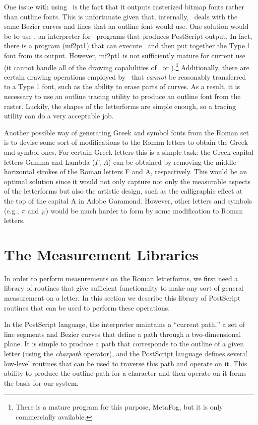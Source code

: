 \documentclass[12pt]{article}
\begin{document}
One issue with using \MF\ is the fact that it outputs rasterized bitmap fonts
rather than outline fonts. This is unfortunate given that, internally, \MF\
deals with the same Bezier curves and lines that an outline font would use. One
solution would be to use \MP, an interpreter for \MF\ programs that produces
PostScript output. In fact, there is a program (mf2pt1) that can execute \MP\
and then put together the Type 1 font from its output. However, mf2pt1 is not
sufficiently mature for current use (it cannot handle all of the drawing
capabilities of \MF\ or \MP).\footnote{There is a mature program for this
purpose, MetaFog, but it is only commercially available.} Additionally, there
are certain drawing operations employed by \MF\ that \emph{cannot} be reasonably
transferred to a Type 1 font, such as the ability to erase parts of curves. As a
result, it is necessary to use an outline tracing utility to produce an outline
font from the raster. Luckily, the shapes of the letterforms are simple enough,
so a tracing utility can do a very acceptable job.

Another possible way of generating Greek and symbol fonts from the Roman set is
to devise some sort of modifications to the Roman letters to obtain the Greek
and symbol ones. For certain Greek letters this is a simple task: the Greek
capital letters Gamma and Lambda ($\Gamma$, $\Lambda$) can be obtained by
removing the middle horizontal strokes of the Roman letters F and A,
respectively. This would be an optimal solution since it would not only capture
not only the measurable aspects of the letterforms but also the artistic design,
such as the calligraphic effect at the top of the capital A in Adobe Garamond.
However, other letters and symbols (e.g., $\pi$ and $\wp$) would be much harder
to form by some modification to Roman letters.

\section{The Measurement Libraries}

In order to perform measurements on the Roman letterforms, we first need a
library of routines that give sufficient functionality to make any sort of
general measurement on a letter. In this section we describe this library of
PostScript routines that can be used to perform these operations.

In the PostScript language, the interpreter maintains a ``current path,'' a set
of line segments and Bezier curves that define a path through a two-dimensional
plane. It is simple to produce a path that corresponds to the outline of a given
letter (using the \emph{charpath} operator), and the PostScript language defines
several low-level routines that can be used to traverse this path and operate on
it. This ability to produce the outline path for a character and then operate on
it forms the basis for our system.
\end{document}
